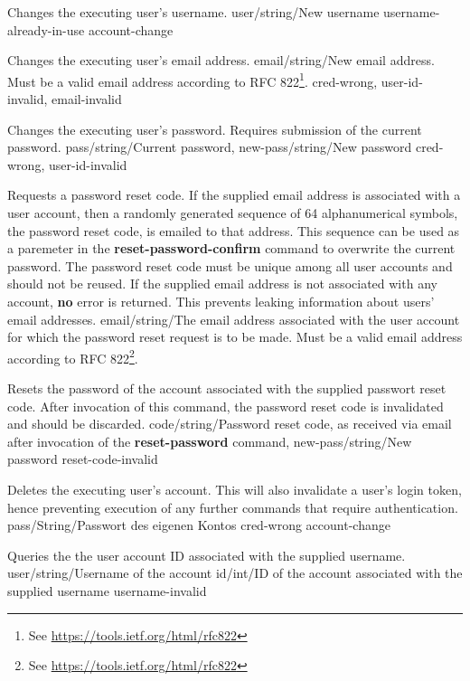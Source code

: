 \documentclass[parskip=full,11pt]{scrartcl}
\begin{document}
{Changes the executing user's username.}
{user/string/New username}
{}
{username-already-in-use}
{account-change}

{Changes the executing user's email address.}
{email/string/New email address.
Must be a valid email address according to
RFC 822\footnote{See \url{https://tools.ietf.org/html/rfc822}}.}
{}
{cred-wrong, user-id-invalid, email-invalid}
{}

{Changes the executing user's password.
Requires submission of the current password.}
{pass/string/Current password,
new-pass/string/New password}
{}
{cred-wrong, user-id-invalid}
{}

{Requests a password reset code.
If the supplied email address is associated with a user account, then a
randomly generated sequence of 64 alphanumerical symbols, the password reset
code, is emailed to that address.
This sequence can be used as a paremeter in the \textbf{reset-password-confirm}
command to overwrite the current password.
The password reset code must be unique among all user accounts and should not
be reused.
If the supplied email address is not associated with any account, \textbf{no}
error is returned.
This prevents leaking information about users' email addresses.}
{email/string/The email address associated with the user account for which the
password reset request is to be made.
Must be a valid email address according to
RFC 822\footnote{See \url{https://tools.ietf.org/html/rfc822}}.}
{}
{}
{}

{Resets the password of the account associated with the supplied passwort reset
code.
After invocation of this command, the password reset code is invalidated and
should be discarded.}
{code/string/Password reset code{,} as received via email after invocation of
    the \textbf{reset-password} command,
new-pass/string/New password}
{}
{reset-code-invalid}
{}

{Deletes the executing user's account.
This will also invalidate a user's login token, hence preventing execution of
any further commands that require authentication.}
{pass/String/Passwort des eigenen Kontos}
{}
{cred-wrong}
{account-change}

{Queries the the user account ID associated with the supplied username.}
{user/string/Username of the account}
{id/int/ID of the account associated with the supplied username}
{username-invalid}
{}
\end{document}
